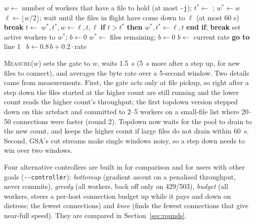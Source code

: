 \documentclass[11pt,a4paper]{article}
\newcommand{\code}[1]{\texttt{#1}}
\newcommand{\secref}[1]{Section~\ref{#1}}
\begin{document}
\begin{algorithm}[t]
\caption{topdown: explore down from the cap, commit, watch passively.}
\label{alg:topdown}
\small
\begin{algorithmic}[1]
\State $w \gets$ number of workers that have a file to hold (at most \code{-j}); $t^* \gets$ ; $w^* \gets w$
  \State $\ell \gets \lfloor w/2 \rfloor$; wait until the files in flight have come down to $\ell$ (at most 60 s)
   \textbf{break} \EndIf
  \State $t \gets$ 
     \State $w^*, t^*, w \gets \ell, t, \ell$ 
  \Else
     \State \textbf{if} $t > t^*$ \textbf{then} $w^*, t^* \gets \ell, t$ \textbf{end if}; \textbf{break}
  \EndIf
\EndWhile
\State set active workers to $w^*$; $b \gets 0$ 
\Loop {}
   $w^* \gets$ files remaining; $b \gets 0$ 
   $b \gets$ current rate
   \textbf{go to} line 1 
  \Else\ $b \gets 0.8\,b + 0.2\cdot$rate
  \EndIf
\EndLoop
\end{algorithmic}
\end{algorithm}

\textsc{Measure}($w$) sets the gate to $w$, waits 1.5~s (5~s more after a step up, for new files to connect), and
averages the byte rate over a 5-second window. Two details came from measurements. First, the gate acts only at file
pickup, so right after a step down the files started at the higher count are still running and the lower count reads
the higher count's throughput; the first topdown version stepped down on this artefact and committed to 2--5 workers
on a small-file list where 20--50 connections were faster (round 2). Topdown now waits for the pool to drain to the new
count, and keeps the higher count if large files do not drain within 60~s. Second, GSA's cut streams make single
windows noisy, so a step down needs to win over two windows.

Four alternative controllers are built in for comparison and for users with other goals (\code{-{}-controller}):
\emph{bottomup} (gradient ascent on a penalised throughput, never commits), \emph{greedy} (all workers, back off only on
429/503), \emph{budget} (all workers, steers a per-host connection budget up while it pays and down on distress; the
fewest connections) and \emph{knee} (finds the fewest connections that give near-full speed). They are compared in
\secref{sec:rounds}.
\end{document}
